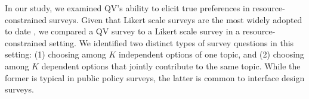 

In our study, we examined QV's ability to elicit true preferences in resource-constrained surveys. Given that Likert scale surveys are the most widely adopted to date \cite{moors2016two}, we compared a QV survey to a Likert scale survey \cite{likert1932technique} in a resource-constrained setting. We identified two distinct types of survey questions in this setting: (1) choosing among $K$ independent options of one topic, and (2) choosing among $K$ dependent options that jointly contribute to the same topic. While the former is typical in public policy surveys, the latter is common to interface design surveys.


